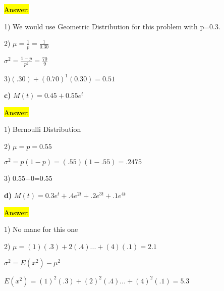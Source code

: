 \documentclass{article}
\begin{document}
\hl{Answer:}

\vspace{2mm}

1) We would use Geometric Distribution for this problem with p=0.3.

\vspace{2mm}

2) $\mu=\frac{1}{p}=\frac{1}{0.30}$

\vspace{2mm}

$\sigma^{2}=\frac{1-p}{p^{2}}=\frac{70}{9}$

\vspace{2mm}

$3) (.30)+(0.70)^{1}(0.30)=0.51$

\vspace{5mm}


\textbf{c)} $M(t)=0.45+0.55e^{t}$

\vspace{2mm}

\hl{Answer:}

\vspace{2mm}

1) Bernoulli Distribution

\vspace{2mm}

2) $\mu=p=0.55$

$\sigma^{2}=p(1-p)=(.55)(1-.55)=.2475$

\vspace{2mm}

3) 0.55+0=0.55

\vspace{5mm}

\newpage
\textbf{d)} $M(t)=0.3e^{t}+.4e^{2t}+.2e^{3t}+.1e^{4t}$

\vspace{2mm}

\hl{Answer:}

\vspace{2mm}

1) No mane for this one

\vspace{2mm}

2) $\mu=(1)(.3)+2(.4)...+(4)(.1)=2.1$

$\sigma^{2}=E(x^{2})-\mu^{2}$

\vspace{2mm}

$E(x^{2})=(1)^{2}(.3)+(2)^{2}(.4)...+(4)^{2}(.1)=5.3$

\vspace{2mm}
\end{document}
